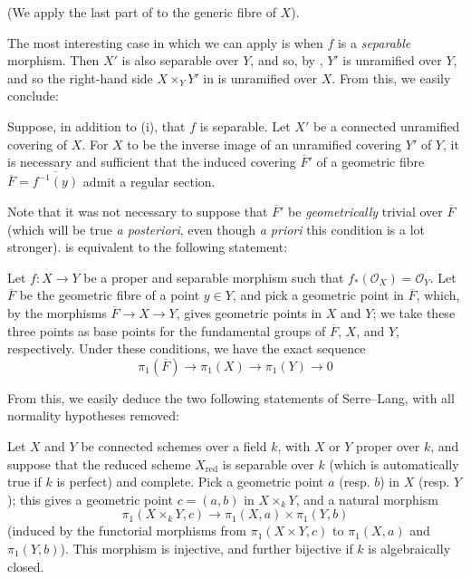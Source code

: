 \begin{cproof}
    (We apply the last part of  to the generic fibre of $X$).
\end{cproof}


The most interesting case in which we can apply  is when $f$ is a \emph{separable} morphism.
Then $X'$ is also separable over $Y$, and so, by , $Y'$ is unramified over $Y$, and so the right-hand side $X\times_YY'$ in  is unramified over $X$.
From this, we easily conclude:

\begin{corollary}\label{fga2-theorem-11-corollary-3}
    Suppose, in addition to (i), that $f$ is separable.
    Let $X'$ be a connected unramified covering of $X$.
    For $X$ to be the inverse image of an unramified covering $Y'$ of $Y$, it is necessary and sufficient that the induced covering $\overline{F}'$ of a geometric fibre $\overline{F}=\overline{f^{-1}(y)}$ admit a regular section.
\end{corollary}


Note that it was not necessary to suppose that $\overline{F}'$ be \emph{geometrically} trivial over $\overline{F}$ (which will be true \emph{a posteriori}, even though \emph{a priori} this condition is a lot stronger).
 is equivalent to the following statement:

\begin{corollary}\label{fga2-theorem-11-corollary-4}
    Let $f\colon X\to Y$ be a proper and separable morphism such that $f_*(\mathcal{O}_X)=\mathcal{O}_Y$.
    Let $\overline{F}$ be the geometric fibre of a point $y\in Y$, and pick a geometric point in $\overline{F}$, which, by the morphisms $\overline{F}\to X\to Y$, gives geometric points in $X$ and $Y$; we take these three points as base points for the fundamental groups of $\overline{F}$, $X$, and $Y$, respectively.
    Under these conditions, we have the exact sequence
    \[\boxed{\pi_1(\overline{F}) \to \pi_1(X) \to \pi_1(Y) \to 0}\]
\end{corollary}

From this, we easily deduce the two following statements of Serre–Lang, with all normality hypotheses removed:

\begin{corollary}\label{fga2-theorem-11-corollary-5}
    Let $X$ and $Y$ be connected schemes over a field $k$, with $X$ or $Y$ proper over $k$, and suppose that the reduced scheme $X_\mathrm{red}$ is separable over $k$ (which is automatically true if $k$ is perfect) and complete.
    Pick a geometric point $a$ (resp. $b$) in $X$ (resp. $Y$); this gives a geometric point $c=(a,b)$ in $X\times_kY$, and a natural morphism
    \[\pi_1(X\times_kY,c) \to \pi_1(X,a)\times\pi_1(Y,b)\]
    (induced by the functorial morphisms from $\pi_1(X\times Y,c)$ to $\pi_1(X,a)$ and $\pi_1(Y,b)$).
    This morphism is injective, and further bijective if $k$ is algebraically closed.
\end{corollary}

